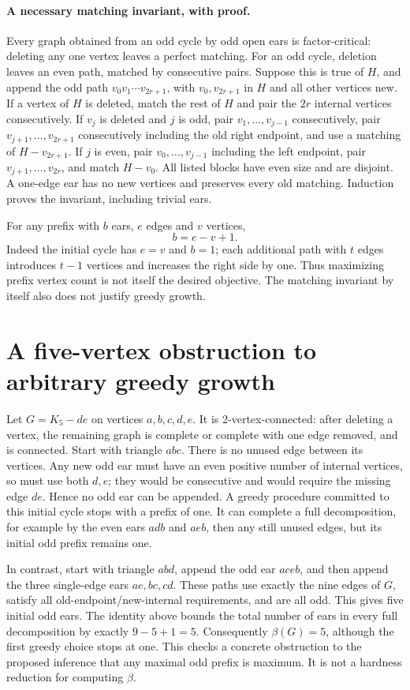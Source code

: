 \documentclass[11pt]{article}
\begin{document}
\paragraph{A necessary matching invariant, with proof.}
Every graph obtained from an odd cycle by odd open ears is factor-critical:
deleting any one vertex leaves a perfect matching. For an odd cycle, deletion
leaves an even path, matched by consecutive pairs.
Suppose this is true of $H$, and append the odd path
$v_0v_1\cdots v_{2r+1}$, with $v_0,v_{2r+1}$ in $H$ and all other
vertices new. If a vertex of $H$ is deleted, match the rest of $H$ and pair
the $2r$ internal vertices consecutively. If $v_j$ is deleted and $j$ is odd,
pair $v_1,\ldots,v_{j-1}$ consecutively, pair
$v_{j+1},\ldots,v_{2r+1}$ consecutively including the old right endpoint,
and use a matching of $H-v_{2r+1}$. If $j$ is even, pair
$v_0,\ldots,v_{j-1}$ including the left endpoint, pair
$v_{j+1},\ldots,v_{2r}$, and match $H-v_0$. All listed blocks have even
size and are disjoint. A one-edge ear has no new vertices and preserves every
old matching. Induction proves the invariant, including trivial ears.

For any prefix with $b$ ears, $e$ edges and $v$ vertices,
\[
b=e-v+1.
\]
Indeed the initial cycle has $e=v$ and $b=1$; each additional path with
$t$ edges introduces $t-1$ vertices and increases the right side by one.
Thus maximizing prefix vertex count is not itself the desired objective.
The matching invariant by itself also does not justify greedy growth.

\section{A five-vertex obstruction to arbitrary greedy growth}
Let $G=K_5-de$ on vertices $a,b,c,d,e$. It is 2-vertex-connected:
after deleting a vertex, the remaining graph is complete or complete with one
edge removed, and is connected. Start with triangle $abc$. There is no unused
edge between its vertices. Any new odd ear must have an even positive number
of internal vertices, so must use both $d,e$; they would be consecutive and
would require the missing edge $de$. Hence no odd ear can be appended.
A greedy procedure committed to this initial cycle stops with a prefix of one.
It can complete a full decomposition, for example by the even ears $adb$ and
$aeb$, then any still unused edges, but its initial odd prefix remains one.

In contrast, start with triangle $abd$, append the odd ear $aceb$, and then
append the three single-edge ears $ae,bc,cd$. These paths use exactly the nine
edges of $G$, satisfy all old-endpoint/new-internal requirements, and are all
odd. This gives five initial odd ears. The identity above bounds the total
number of ears in every full decomposition by exactly $9-5+1=5$.
Consequently $\beta(G)=5$, although the first greedy choice stops at one.
This checks a concrete obstruction to the proposed inference that any maximal
odd prefix is maximum. It is not a hardness reduction for computing $\beta$.
\end{document}
